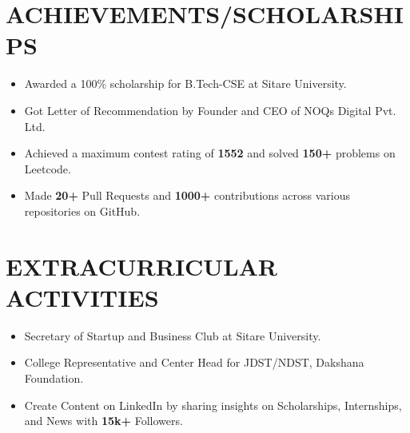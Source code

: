 \documentclass[a4paper,10pt]{article}
\begin{document}
\section*{ACHIEVEMENTS/SCHOLARSHIPS}
\begin{itemize}[leftmargin=4em]
\item Awarded a 100\% scholarship for B.Tech-CSE at Sitare University.
\item Got Letter of Recommendation by Founder and CEO of NOQs Digital Pvt. Ltd.
\item Achieved a maximum contest rating of \textbf{1552} and solved \textbf{150+} problems on Leetcode.
\item Made \textbf{20+} Pull Requests and \textbf{1000+} contributions across various repositories on GitHub.
\end{itemize}


\section*{EXTRACURRICULAR ACTIVITIES}
\begin{itemize}[leftmargin=4em]
\item Secretary of Startup and Business Club at Sitare University.
\item College Representative and Center Head for JDST/NDST, Dakshana Foundation.
\item Create Content on LinkedIn by sharing insights on Scholarships, Internships, and News with \textbf{15k+} Followers.
\end{itemize}
\end{document}
